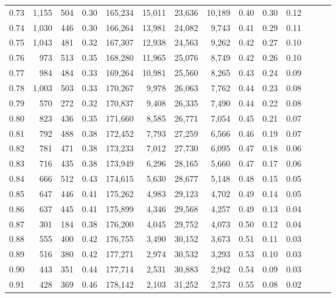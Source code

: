 \begin{tabular}{rrrrrrrrrrrrrr}
0.73 &  1,155 &  504 &  0.30 &  165,234 &   15,011 &  23,636 &  10,189 &  0.40 &  0.30 &      0.12 \\
0.74 &  1,030 &  446 &  0.30 &  166,264 &   13,981 &  24,082 &   9,743 &  0.41 &  0.29 &      0.11 \\
0.75 &  1,043 &  481 &  0.32 &  167,307 &   12,938 &  24,563 &   9,262 &  0.42 &  0.27 &      0.10 \\
0.76 &    973 &  513 &  0.35 &  168,280 &   11,965 &  25,076 &   8,749 &  0.42 &  0.26 &      0.10 \\
0.77 &    984 &  484 &  0.33 &  169,264 &   10,981 &  25,560 &   8,265 &  0.43 &  0.24 &      0.09 \\
0.78 &  1,003 &  503 &  0.33 &  170,267 &    9,978 &  26,063 &   7,762 &  0.44 &  0.23 &      0.08 \\
0.79 &    570 &  272 &  0.32 &  170,837 &    9,408 &  26,335 &   7,490 &  0.44 &  0.22 &      0.08 \\
0.80 &    823 &  436 &  0.35 &  171,660 &    8,585 &  26,771 &   7,054 &  0.45 &  0.21 &      0.07 \\
0.81 &    792 &  488 &  0.38 &  172,452 &    7,793 &  27,259 &   6,566 &  0.46 &  0.19 &      0.07 \\
0.82 &    781 &  471 &  0.38 &  173,233 &    7,012 &  27,730 &   6,095 &  0.47 &  0.18 &      0.06 \\
0.83 &    716 &  435 &  0.38 &  173,949 &    6,296 &  28,165 &   5,660 &  0.47 &  0.17 &      0.06 \\
0.84 &    666 &  512 &  0.43 &  174,615 &    5,630 &  28,677 &   5,148 &  0.48 &  0.15 &      0.05 \\
0.85 &    647 &  446 &  0.41 &  175,262 &    4,983 &  29,123 &   4,702 &  0.49 &  0.14 &      0.05 \\
0.86 &    637 &  445 &  0.41 &  175,899 &    4,346 &  29,568 &   4,257 &  0.49 &  0.13 &      0.04 \\
0.87 &    301 &  184 &  0.38 &  176,200 &    4,045 &  29,752 &   4,073 &  0.50 &  0.12 &      0.04 \\
0.88 &    555 &  400 &  0.42 &  176,755 &    3,490 &  30,152 &   3,673 &  0.51 &  0.11 &      0.03 \\
0.89 &    516 &  380 &  0.42 &  177,271 &    2,974 &  30,532 &   3,293 &  0.53 &  0.10 &      0.03 \\
0.90 &    443 &  351 &  0.44 &  177,714 &    2,531 &  30,883 &   2,942 &  0.54 &  0.09 &      0.03 \\
0.91 &    428 &  369 &  0.46 &  178,142 &    2,103 &  31,252 &   2,573 &  0.55 &  0.08 &      0.02 \\

\end{tabular}
